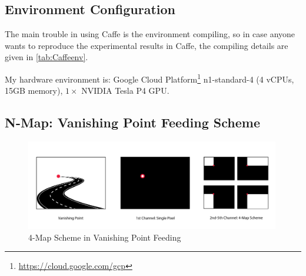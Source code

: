 \begin{spacing}{1.5}
\subsection{Environment Configuration}

The main trouble in using Caffe is the environment compiling, so in case anyone wants to reproduce the experimental results in Caffe, the compiling details are given in \autoref{tab:Caffeenv}.

\begin{table}[ht]
\centering
\caption{Dependency Environment of Caffe v1.0}
\label{tab:Caffeenv}
\end{table}

My hardware environment is: Google Cloud Platform\footnote{\url{https://cloud.google.com/gcp}} n1-standard-4 (4 vCPUs, 15GB memory), $1 \times$ NVIDIA Tesla P4 GPU.

\subsection{N-Map: Vanishing Point Feeding Scheme}
\label{subsec:fourmap}

\begin{figure}[ht]
\centering
\includegraphics[width=0.99\textwidth, fbox]{Chapter3/fourmap.pdf}
\caption{4-Map Scheme in Vanishing Point Feeding}
\label{fig:fourmap} 
\end{figure}



\end{spacing}
